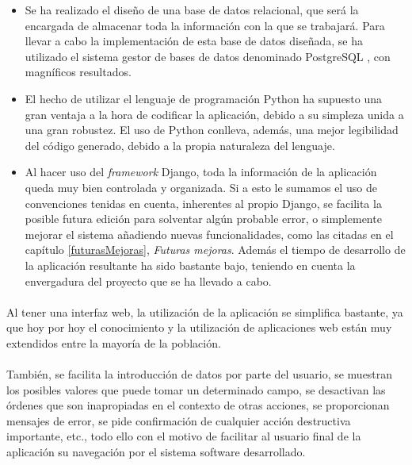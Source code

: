 \begin{itemize}
 \item Se ha realizado el diseño de una base de datos relacional, que será la
 encargada de almacenar toda la información con la que se trabajará. Para llevar
 a cabo la implementación de esta base de datos diseñada, se ha utilizado el
 sistema gestor de bases de datos denominado PostgreSQL \cite{postgresql}, con
 magníficos resultados.
 \item El hecho de utilizar el lenguaje de programación Python \cite{python} ha
 supuesto una gran ventaja a la hora de codificar la aplicación, debido a su
 simpleza unida a una gran robustez. El uso de Python conlleva, además,
 una mejor legibilidad del código generado, debido a la propia naturaleza del
 lenguaje.
 \item Al hacer uso del \textit{framework} Django, toda la información de la
 aplicación queda muy bien controlada y organizada. Si a esto le sumamos el uso
 de convenciones tenidas en cuenta, inherentes al propio Django, se facilita la
 posible futura edición para solventar algún probable error, o simplemente
 mejorar el sistema añadiendo nuevas funcionalidades, como las citadas en el
 capítulo \ref{futurasMejoras}, \textit{Futuras mejoras}. Además el tiempo de
 desarrollo de la aplicación resultante ha sido bastante bajo, teniendo en
 cuenta la envergadura del proyecto que se ha llevado a cabo.
\end{itemize}

\paragraph{}Al tener una interfaz web, la utilización de la aplicación se
simplifica bastante, ya que hoy por hoy el conocimiento y la utilización de
aplicaciones web están muy extendidos entre la mayoría de la población.

\paragraph{}También, se facilita la introducción de datos por parte del usuario,
se muestran los posibles valores que puede tomar un determinado campo, se
desactivan las órdenes que son inapropiadas en el contexto de otras acciones, se
proporcionan mensajes de error, se pide confirmación de cualquier acción
destructiva importante, etc., todo ello con el motivo de facilitar al usuario
final de la aplicación su navegación por el sistema software desarrollado.

